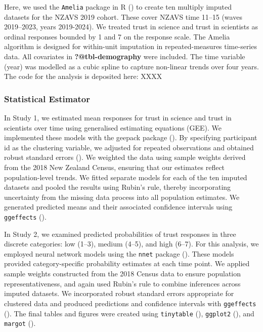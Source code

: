 \documentclass[
  single column]{article}
\begin{document}
Here, we used the \texttt{Amelia} package in R
() to create ten
multiply imputed datasets for the NZAVS 2019 cohort. These cover NZAVS
time 11--15 (waves 2019--2023, years 2019-2024). We treated trust in
science and trust in scientists as ordinal responses bounded by 1 and 7
on the response scale. The Amelia algorithm is designed for within-unit
imputation in repeated-measures time-series data. All covariates in
\textbf{?@tbl-demography} were included. The time variable (year) was
modelled as a cubic spline to capture non-linear trends over four years.
The code for the analysis is deposited here: XXXX

\subsubsection{Statistical Estimator}\label{statistical-estimator}

In Study 1, we estimated mean responses for trust in science and trust
in scientists over time using generalised estimating equations (GEE). We
implemented these models with the geepack package
(). By specifying
participant id as the clustering variable, we adjusted for repeated
observations and obtained robust standard errors
(). We
weighted the data using sample weights derived from the 2018 New Zealand
Census, ensuring that our estimates reflect population-level trends. We
fitted separate models for each of the ten imputed datasets and pooled
the results using Rubin's rule, thereby incorporating uncertainty from
the missing data process into all population estimates. We generated
predicted means and their associated confidence intervals using
\texttt{ggeffects} ().

In Study 2, we examined predicted probabilities of trust responses in
three discrete categories: low (1--3), medium (4--5), and high (6--7).
For this analysis, we employed neural network models using the
\texttt{nnet} package (). These models provided category-specific probability estimates at
each time point. We applied sample weights constructed from the 2018
Census data to ensure population representativeness, and again used
Rubin's rule to combine inferences across imputed datasets. We
incorporated robust standard errors appropriate for clustered data and
produced predictions and confidence intervals with \texttt{ggeffects}
(). The final tables and
figures were created using \texttt{tinytable}
(), \texttt{ggplot2}
(), and \texttt{margot}
().
\end{document}
